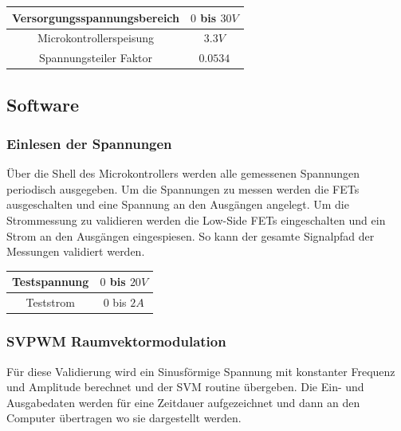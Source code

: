 \begin{center}
	\begin{tabular}{|c|c|}
		\hline 
		Versorgungsspannungsbereich & $0$ bis $30V$ \\ \hline
		Microkontrollerspeisung & $3.3V$ \\ \hline
		Spannungsteiler Faktor & $0.0534$ \\ \hline
	\end{tabular} 
	\label{tab:vmessbed}
\end{center}


\subsection*{Software}
\subsubsection*{Einlesen der Spannungen}
Über die Shell des Microkontrollers werden alle gemessenen Spannungen periodisch ausgegeben. Um die Spannungen zu messen werden die FETs ausgeschalten und eine Spannung an den Ausgängen angelegt. Um die Strommessung zu validieren werden die Low-Side FETs eingeschalten und ein Strom an den Ausgängen eingespiesen. So kann der gesamte Signalpfad der Messungen validiert werden.

\begin{center}
	\begin{tabular}{|c|c|}
		\hline 
		Testspannung & $0$ bis $20V$ \\ \hline
		Teststrom & $0$ bis $2A$ \\ \hline
	\end{tabular} 
	\label{tab:swvmessbed}
\end{center}

\subsubsection*{SVPWM Raumvektormodulation}
Für diese Validierung wird ein Sinusförmige Spannung mit konstanter Frequenz und Amplitude berechnet und der SVM routine übergeben. Die Ein- und Ausgabedaten werden für eine Zeitdauer aufgezeichnet und dann an den Computer übertragen wo sie dargestellt werden.

